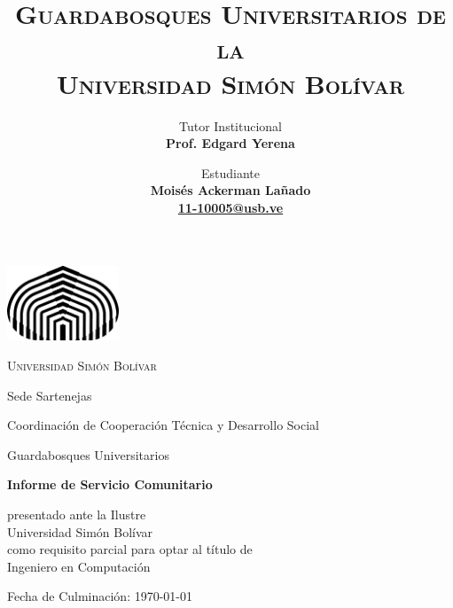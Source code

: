 \documentclass[12pt,letter]{article}
\title{\Large\bfseries\scshape{Guardabosques Universitarios de la \\ Universidad Simón Bolívar\vspace{1cm}}}
\author{
  Tutor Institucional\\
  \bfseries{Prof. Edgard Yerena}
  \and
  \and
  \and
  \and
  Estudiante\\
  \bfseries{Moisés Ackerman Lañado}\\
  \protect\url{11-10005@usb.ve}
}
\date{}
\begin{document}
\begin{titlepage}

    \centering
    \includegraphics[width=0.25\textwidth]{logoUSB.png}\par\vspace{1cm}

    {\scshape\Large Universidad Simón Bolívar \par}
    \vspace{0.2cm}
    {Sede Sartenejas \par}
    {Coordinación de Cooperación Técnica y Desarrollo Social \par}
    {Guardabosques Universitarios \par}

    {\let\newpage\relax\maketitle}
    \thispagestyle{empty}

    \vfill

    \vspace{2cm}

    {\bfseries{Informe de Servicio Comunitario} \par}
    {presentado ante la Ilustre \\ Universidad Simón Bolívar \\ como requisito parcial para optar al título de \\ Ingeniero en Computación \par}

    \vfill

    {\large Fecha de Culminación: \today\par}

\end{titlepage}
\end{document}
